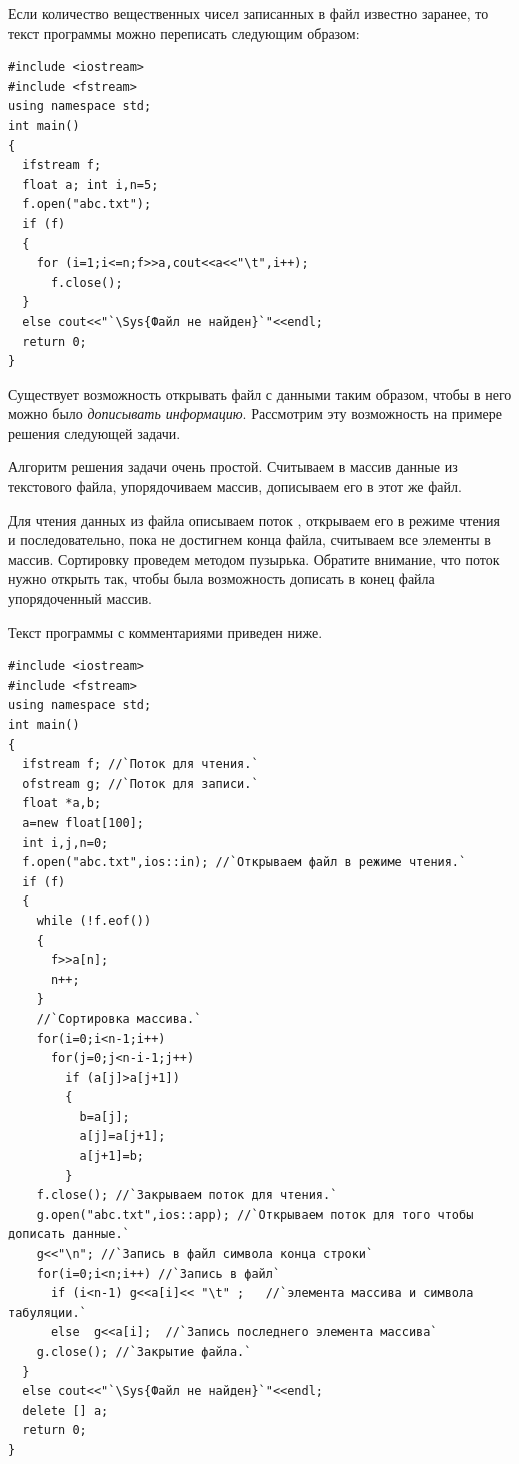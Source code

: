 Если количество вещественных чисел записанных в файл известно заранее, то текст программы можно переписать следующим
образом:

\begin{lstlisting}
#include <iostream>
#include <fstream>
using namespace std;
int main()
{
  ifstream f;
  float a; int i,n=5;
  f.open("abc.txt");
  if (f)
  {
    for (i=1;i<=n;f>>a,cout<<a<<"\t",i++);
      f.close();
  }
  else cout<<"`\Sys{Файл не найден}`"<<endl;
  return 0;
}
\end{lstlisting}

Существует возможность открывать файл с данными таким образом, чтобы в него можно было \emph{дописывать
информацию}. Рассмотрим эту возможность на примере решения следующей задачи.


Алгоритм решения задачи очень простой. Считываем в массив данные из текстового файла, упорядочиваем массив, дописываем
его в этот же файл.

Для чтения данных из файла описываем поток , открываем его в режиме чтения и последовательно,
пока не достигнем конца файла, считываем все элементы в массив. Сортировку проведем методом пузырька. Обратите
внимание, что поток нужно открыть так, чтобы была возможность дописать в конец файла упорядоченный массив.

Текст программы с комментариями приведен ниже. %
\begin{lstlisting}
#include <iostream>
#include <fstream>
using namespace std;
int main()
{
  ifstream f; //`Поток для чтения.`
  ofstream g; //`Поток для записи.`
  float *a,b;
  a=new float[100];
  int i,j,n=0;
  f.open("abc.txt",ios::in); //`Открываем файл в режиме чтения.`
  if (f)	
  {
    while (!f.eof())
    {
      f>>a[n];
      n++;
    }
    //`Сортировка массива.`
    for(i=0;i<n-1;i++)
      for(j=0;j<n-i-1;j++)
        if (a[j]>a[j+1])
        {
          b=a[j];
          a[j]=a[j+1];
          a[j+1]=b;
        }
    f.close(); //`Закрываем поток для чтения.`
    g.open("abc.txt",ios::app); //`Открываем поток для того чтобы дописать данные.`
    g<<"\n"; //`Запись в файл символа конца строки` 
    for(i=0;i<n;i++) //`Запись в файл`
      if (i<n-1) g<<a[i]<< "\t" ;	//`элемента массива и символа табуляции.`
      else  g<<a[i];  //`Запись последнего элемента массива`
    g.close(); //`Закрытие файла.`
  }
  else cout<<"`\Sys{Файл не найден}`"<<endl;
  delete [] a;
  return 0;
}
\end{lstlisting}

